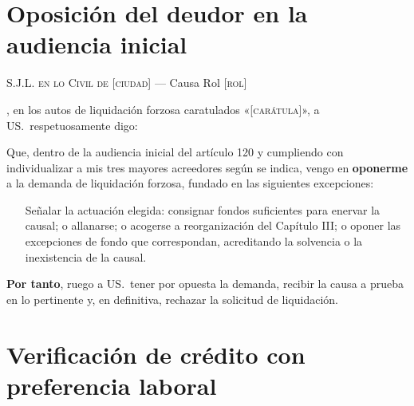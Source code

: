 \section{Oposición del deudor en la audiencia inicial}

\begin{escrito}
\small
\noindent\textsc{S.J.L. en lo Civil de} [\textsc{ciudad}] --- Causa Rol [\textsc{rol}]

\medskip
{}, en los autos de liquidación forzosa caratulados
«[\textsc{carátula}]», a US.\ respetuosamente digo:

\medskip
Que, dentro de la audiencia inicial del artículo 120 y cumpliendo con individualizar a mis
tres mayores acreedores según se indica, vengo en \textbf{oponerme} a la demanda de
liquidación forzosa, fundado en las siguientes excepciones:

\begin{enumerate}[leftmargin=1.6em]
  \item [Señalar la actuación elegida: consignar fondos suficientes para enervar la causal;
  o allanarse; o acogerse a reorganización del Capítulo III; o oponer las excepciones de
  fondo que correspondan, acreditando la solvencia o la inexistencia de la causal.]
\end{enumerate}

\medskip
\noindent\textbf{Por tanto}, ruego a US.\ tener por opuesta la demanda, recibir la causa a
prueba en lo pertinente y, en definitiva, rechazar la solicitud de liquidación.
\end{escrito}

\section{Verificación de crédito con preferencia laboral}

